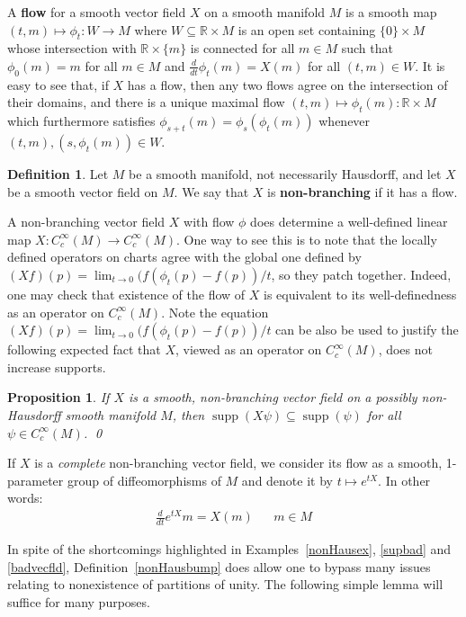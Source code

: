 \documentclass[12pt]{article}
\theoremstyle{plain}
\newtheorem{propn}[thm]{Proposition}
\theoremstyle{definition}
\newtheorem{defn}[thm]{Definition}
\newcommand{\R}{\mathbb{R}}
\newcommand{\supp}{\operatorname{supp}}
\numberwithin{equation}{section}
\begin{document}
A \textbf{flow} for a smooth vector field $X$ on a smooth manifold $M$ is a smooth map $(t,m) \mapsto \phi_t : W \to M$ where  $W \subseteq \R \times M$ is an open set containing $\{0\} \times M$ whose intersection with $\R \times \{m\}$ is connected for all $m \in M$ such that $\phi_0(m)=m$ for all $m \in M$ and $\frac{d}{dt} \phi_t(m) = X(m)$ for all $(t,m) \in W$. It is easy to see that, if $X$ has a flow, then any two flows agree on the intersection of their domains, and there is a unique maximal flow $(t,m)\mapsto \phi_t(m) : \R \times M$ which furthermore satisfies $\phi_{s+t}(m)=\phi_s(\phi_t(m))$ whenever $(t,m) , (s,\phi_t(m)) \in W$. 




\begin{defn}\label{nonbranchingdef}
Let $M$ be a smooth manifold, not necessarily Hausdorff, and let $X$ be a smooth vector field on $M$. We say that $X$ is \textbf{non-branching} if it has a flow.
\end{defn}

A non-branching vector field $X$ with flow $\phi$ does determine a well-defined linear map $X:C_c^\infty(M)\to C_c^\infty(M)$. One way to see this is to note that the locally defined operators on charts agree with the global one defined by $(Xf)(p)=\lim_{t\to0} (f(\phi_t(p)-f(p))/t$, so they patch together. Indeed, one may check that existence of the flow of $X$ is equivalent to its well-definedness as an operator on $C_c^\infty(M)$.  Note the equation $(Xf)(p)=\lim_{t\to0} (f(\phi_t(p)-f(p))/t$ can be also be used to justify the following expected  fact that $X$, viewed as an operator on $C_c^\infty(M)$, does not increase supports.


\begin{propn}\label{nosuppinc}
If $X$ is a smooth, non-branching vector field on a possibly non-Hausdorff smooth manifold $M$, then $\supp(X \psi) \subseteq \supp(\psi)$ for all $\psi \in C_c^\infty(M)$. \qed
\end{propn}

If $X$ is  a \emph{complete} non-branching vector field, we   consider its flow as a smooth, 1-parameter group of diffeomorphisms of $M$  and  denote it by $t \mapsto e^{tX}$. In other words:
\begin{align*}
\tfrac{d}{dt} e^{tX} m =  X(m) && m \in M 
\end{align*}





In spite of the  shortcomings highlighted in Examples~\ref{nonHausex}, \ref{supbad} and \ref{badvecfld}, Definition~\ref{nonHausbump} does allow  one to bypass many issues relating to nonexistence of partitions of unity. The following simple lemma will suffice for many purposes.
\end{document}
